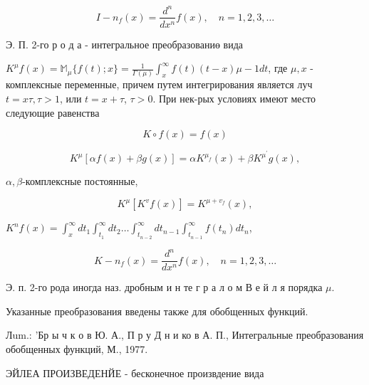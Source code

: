 \documentclass[10pt]{article}
\begin{document}
\[

I-n_{f}(x)=\frac{d^{n}}{d x^{n}} f(x), \quad n=1,2,3, \ldots

\]



Э. П. 2-го р о д а - интегральное преобразованиө вида



$K^{\mu} f(x)=\mathbb{M}_{\mu}\{f(t) ; x\}=\frac{1}{\Gamma(\mu)} \int_{x}^{\infty} f(t)(t-x) \mu-1 d t$, где $\mu, x$ - комплексные переменные, причем путем интегрирования является луч $t=x \tau, \tau>1$, или $t=x+\tau$, $\tau>0$. При нек-рых условиях имеют место следующие равенства



\[

K \circ f(x)=f(x)

\]



\[

K^{\mu}[\alpha f(x)+\beta g(x)]=\alpha K^{\mu_{f}}(x)+\beta K^{\mu^{\prime}} g(x),

\]



$\alpha, \beta$-комплексные постоянные,



\[

K^{\mu}\left[K^{v} f(x)\right]=K^{\mu+v_{f}}(x),

\]



$K^{n} f(x)=\int_{x}^{\infty} d t_{1} \int_{t_{1}}^{\infty} d t_{2} \ldots \int_{t_{n-2}}^{\infty} d t_{n-1} \int_{t_{n-1}}^{\infty} f\left(t_{n}\right) d t_{n}$,



\[

K-n_{f}(x)=\frac{d^{n}}{d x^{n}} f(x), \quad n=1,2,3, \ldots

\]



Э. п. 2-го рода иногда наз. дробным и н те г р а л о м В е й л я порядка $\mu$.



Указанные преобразования введены также для обобщенных функций.



Лum.: 'Бр ы ч к о в Ю. А., П р у Д н и ко в А. П., Интегральные преобразования обобщенных функций, М., 1977.



ЭЙЛЕА ПРОИЗВЕДЕНЙЕ - бесконечное произвдение вида
\end{document}
